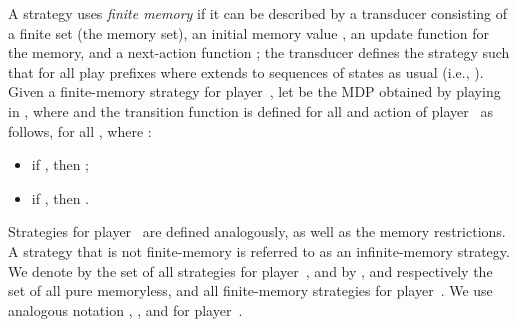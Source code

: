 \documentclass{article}
\begin{document}
A strategy  uses \emph{finite memory} if it can be described 
by a transducer  consisting of a finite
set  (the memory set), an initial memory value , 
an update function  for the memory, 
and a next-action function ; the transducer  
defines the strategy  such that  
for all play prefixes 
where  extends  to sequences of states as usual (i.e.,
).
Given a finite-memory strategy  for player~, let  
be the MDP obtained by playing  in , where 
    and the transition function  is defined
for all  and action  of player~ as follows,
for all , where :
\begin{itemize}
\item if , then 
; 
\item if , then 
.
\end{itemize}


Strategies  for player~ are defined analogously, as well as the memory restrictions.
A strategy that is not finite-memory is referred to as an infinite-memory 
strategy. We denote by  the set of all strategies for player~, 
and by , 
and  respectively the set of all pure memoryless,
and all finite-memory strategies 
for player~. We use analogous notation , , and  for player~.
\end{document}

